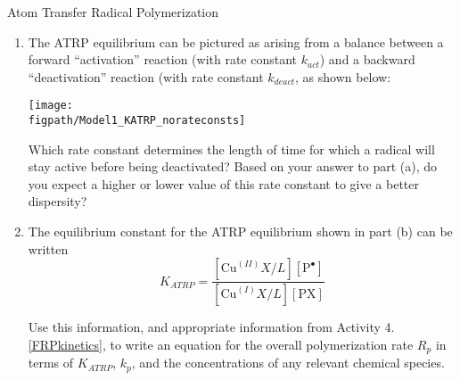\begin{activity}{Atom Transfer Radical Polymerization}
\begin{exercises}
\begin{enumerate}
\begin{solution}
{			Ideally, for the best dispersity, each chain should add only a single monomer in a given activatation-deactivation step.
		}\end{solution}
				
			\item The ATRP equilibrium can be pictured as arising from a balance between a forward ``activation'' reaction (with rate constant $k_{act}$) and a backward ``deactivation'' reaction (with rate constant $k_{deact}$, as shown below:
	
	\centerline{\texttt{[image: \\figpath/Model1\_KATRP\_norateconsts]}}
	
			Which rate constant determines the length of time for which a radical will stay active before being deactivated?  Based on your answer to part (a), do you expect a higher or lower value of this rate constant to give a better dispersity?
		
		\begin{solution}\end{solution}
			
			\item The equilibrium constant for the ATRP equilibrium shown in part (b) can be written
				\begin{equation*}
					K_{ATRP} = \frac{[\text{Cu}^{(II)}X/L][\text{P}^\bullet]}{[\text{Cu}^{(I)}X/L][\text{PX}]}
				\end{equation*}
				
				Use this information, and appropriate information from Activity 4.\ref{FRPkinetics}, to write an equation for the overall polymerization rate $R_p$ in terms of $K_{ATRP}$, $k_p$, and the concentrations of any relevant chemical species.
		
		\begin{solution}\end{solution}
				

\end{enumerate}
\end{exercises}
\end{activity}
